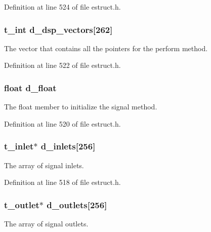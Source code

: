 Definition at line 524 of file estruct.\-h.

\hypertarget{struct__edspbox_a6c9361ef0820022b61cd7894d641c029}{
\subsubsection[{d\-\_\-dsp\-\_\-vectors}]{\setlength{\rightskip}{0pt plus 5cm}t\-\_\-int d\-\_\-dsp\-\_\-vectors\mbox{[}262\mbox{]}}}\label{struct__edspbox_a6c9361ef0820022b61cd7894d641c029}
The vector that contains all the pointers for the perform method. 

Definition at line 522 of file estruct.\-h.

\hypertarget{struct__edspbox_aaa8c8ad1277112523fd01b5058e0fcb5}{
\subsubsection[{d\-\_\-float}]{\setlength{\rightskip}{0pt plus 5cm}float d\-\_\-float}}\label{struct__edspbox_aaa8c8ad1277112523fd01b5058e0fcb5}
The float member to initialize the signal method. 

Definition at line 520 of file estruct.\-h.

\hypertarget{struct__edspbox_af58ea0594fc028861443f36dc2d1ebf4}{
\subsubsection[{d\-\_\-inlets}]{\setlength{\rightskip}{0pt plus 5cm}t\-\_\-inlet$\ast$ d\-\_\-inlets\mbox{[}256\mbox{]}}}\label{struct__edspbox_af58ea0594fc028861443f36dc2d1ebf4}
The array of signal inlets. 

Definition at line 518 of file estruct.\-h.

\hypertarget{struct__edspbox_a529a1e3597eb3ee79f6cabef51f41ef9}{
\subsubsection[{d\-\_\-outlets}]{\setlength{\rightskip}{0pt plus 5cm}t\-\_\-outlet$\ast$ d\-\_\-outlets\mbox{[}256\mbox{]}}}\label{struct__edspbox_a529a1e3597eb3ee79f6cabef51f41ef9}
The array of signal outlets. 

